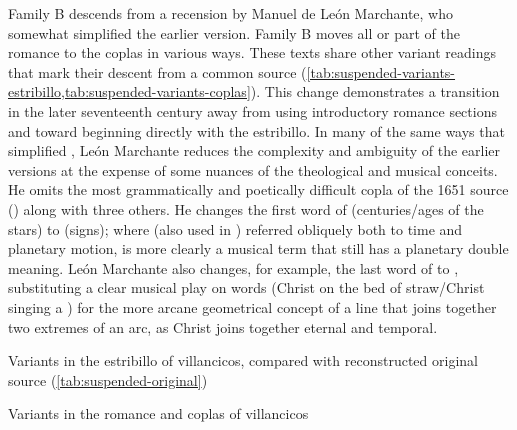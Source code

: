 Family B descends from a recension by Manuel de León Marchante, who somewhat
simplified the earlier version.%
    \Autocite{LeonMarchante:Obras1733}
Family B moves all or part of the romance to the coplas in various ways.
These texts share other variant readings that mark their descent from a common
source (\cref{tab:suspended-variants-estribillo,tab:suspended-variants-coplas}).
This change demonstrates a transition in the later seventeenth century away from
using introductory romance sections and toward beginning directly with
the estribillo.%
    \Autocite{Torrente:Estribillo}
In many of the same ways that  simplified
, León Marchante reduces the complexity and
ambiguity of the earlier versions at the expense of some nuances of the
theological and musical conceits.
He omits the most grammatically and poetically difficult copla of the 1651
source () along with three others.
He changes the first word of  (centuries/ages of
the stars) to  (signs); where  (also used in
) referred obliquely both to time and planetary motion,
 is more clearly a musical term that still has a planetary
double meaning.
León Marchante also changes, for example, the last word of  to , substituting a clear musical play on words
(Christ  on the bed of straw/Christ singing a )
for the more arcane geometrical concept of a line that joins together two
extremes of an arc, as Christ joins together eternal and temporal.

{Variants in the estribillo of  villancicos,
compared with reconstructed original source (\cref{tab:suspended-original})}

{Variants in the romance and coplas of  villancicos}


